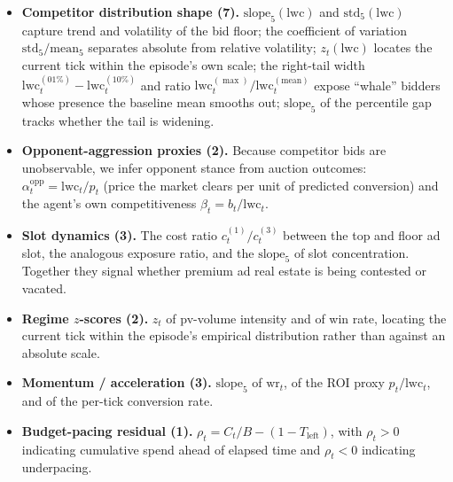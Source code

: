\documentclass[11pt]{article}
\begin{document}
\begin{itemize}\itemsep 2pt
  \item \textbf{Competitor distribution shape (7).}
        $\mathrm{slope}_5(\mathrm{lwc})$ and $\mathrm{std}_5(\mathrm{lwc})$
        capture trend and volatility of the bid floor; the coefficient of
        variation $\mathrm{std}_5/\mathrm{mean}_5$ separates absolute from
        relative volatility; $z_t(\mathrm{lwc})$ locates the current tick
        within the episode's own scale; the right-tail width
        $\mathrm{lwc}^{(01\%)}_t-\mathrm{lwc}^{(10\%)}_t$ and ratio
        $\mathrm{lwc}^{(\max)}_t/\mathrm{lwc}^{(\mathrm{mean})}_t$ expose
        ``whale'' bidders whose presence the baseline mean smooths out;
        $\mathrm{slope}_5$ of the percentile gap tracks whether the tail
        is widening.
  \item \textbf{Opponent-aggression proxies (2).} Because competitor bids
        are unobservable, we infer opponent stance from auction outcomes:
        $\alpha^{\mathrm{opp}}_t = \mathrm{lwc}_t / p_t$ (price the market
        clears per unit of predicted conversion) and the agent's own
        competitiveness $\beta_t = b_t / \mathrm{lwc}_t$.
  \item \textbf{Slot dynamics (3).} The cost ratio
        $c^{(1)}_t/c^{(3)}_t$ between the top and floor ad slot, the
        analogous exposure ratio, and the $\mathrm{slope}_5$ of slot
        concentration. Together they signal whether premium ad real estate
        is being contested or vacated.
  \item \textbf{Regime $z$-scores (2).} $z_t$ of pv-volume intensity and of
        win rate, locating the current tick within the episode's empirical
        distribution rather than against an absolute scale.
  \item \textbf{Momentum / acceleration (3).} $\mathrm{slope}_5$ of
        $\mathrm{wr}_t$, of the ROI proxy $p_t/\mathrm{lwc}_t$, and of the
        per-tick conversion rate.
  \item \textbf{Budget-pacing residual (1).}
        $\rho_t = C_t/B - (1-T_{\!\text{left}})$, with $\rho_t>0$ indicating
        cumulative spend ahead of elapsed time and $\rho_t<0$ indicating
        underpacing.
\end{itemize}
\end{document}
